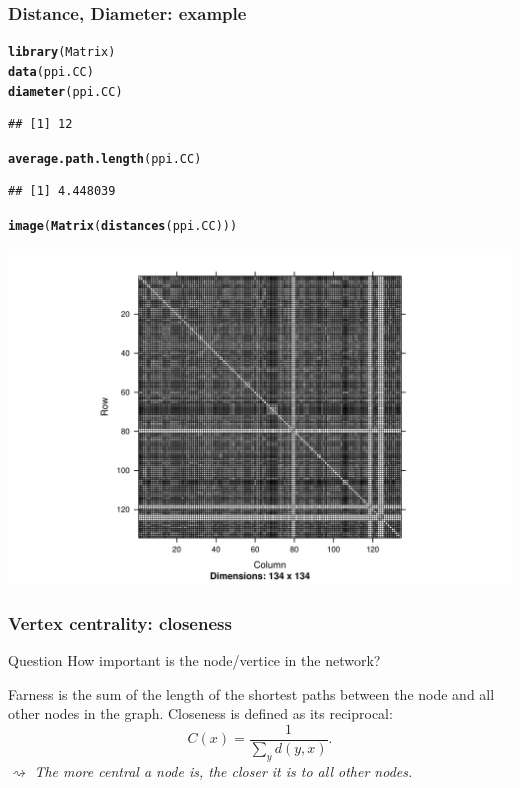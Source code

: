 \documentclass{beamer}\usepackage[]{graphicx}\usepackage[]{color}
\makeatletter
\newcommand{\hlstd}[1]{\textcolor[rgb]{0.345,0.345,0.345}{#1}}%
\newcommand{\hlkwd}[1]{\textcolor[rgb]{0.737,0.353,0.396}{\textbf{#1}}}%
\newenvironment{kframe}{%
 \def\at@end@of@kframe{}%
 \ifinner\ifhmode%
  \def\at@end@of@kframe{\end{minipage}}%
  \begin{minipage}{\columnwidth}%
 \fi\fi%
 \def\FrameCommand##1{\hskip\@totalleftmargin \hskip-\fboxsep
 \colorbox{shadecolor}{##1}\hskip-\fboxsep
     \hskip-\linewidth \hskip-\@totalleftmargin \hskip\columnwidth}%
 \MakeFramed {\advance\hsize-\width
   \@totalleftmargin\z@ \linewidth\hsize
   \@setminipage}}%
 {\par\unskip\endMakeFramed%
 \at@end@of@kframe}
\newenvironment{knitrout}{}{} %
\makeatother
\begin{document}
\begin{frame}
  \frametitle{Distance, Diameter: example}
\begin{knitrout}\scriptsize
{}\color{fgcolor}\begin{kframe}
\begin{alltt}
\hlkwd{library}\hlstd{(Matrix)}
\hlkwd{data}\hlstd{(ppi.CC)}
\hlkwd{diameter}\hlstd{(ppi.CC)}
\end{alltt}
\begin{verbatim}
## [1] 12
\end{verbatim}
\begin{alltt}
\hlkwd{average.path.length}\hlstd{(ppi.CC)}
\end{alltt}
\begin{verbatim}
## [1] 4.448039
\end{verbatim}
\begin{alltt}
\hlkwd{image}\hlstd{(}\hlkwd{Matrix}\hlstd{(}\hlkwd{distances}\hlstd{(ppi.CC)))}
\end{alltt}
\end{kframe}
\includegraphics[width=.8\textwidth]{figures/distances1-1} 

\end{knitrout}
\end{frame}

\begin{frame}
  \frametitle{Vertex centrality: closeness}

  \begin{block}{Question}
    How important is the node/vertice in the network?
  \end{block}

  \begin{definition}
    Farness is the sum of the length of the shortest paths between the node and all other nodes in the graph. Closeness is defined as its reciprocal:
    \[C(x)={\frac  {1}{\sum _{y}d(y,x)}}.\]
    $\rightsquigarrow$ \textit{The more central a node is, the closer it is to all other nodes.}
  \end{definition}

\end{frame}
\end{document}
